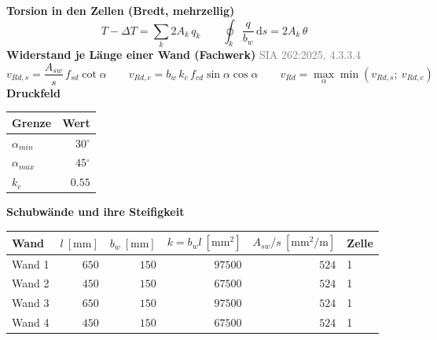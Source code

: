 \documentclass[11pt,a4paper]{article}
\newcommand{\normref}[1]{{\small\textcolor{gray}{#1}}}
\begin{document}
\noindent\textbf{Torsion in den Zellen (Bredt, mehrzellig)}
\begin{equation*}
T - \Delta T = \sum_k 2 A_k\, q_k \qquad \oint_k \frac{q}{b_w}\, \mathrm{d}s = 2 A_k\, \theta
\end{equation*}
\noindent\textbf{Widerstand je Länge einer Wand (Fachwerk)} \hfill \normref{SIA 262:2025, 4.3.3.4}
\begin{equation*}
v_{Rd,s} = \frac{A_{sw}}{s}\, f_{sd} \cot\alpha \qquad v_{Rd,c} = b_w\, k_c\, f_{cd} \sin\alpha \cos\alpha \qquad v_{Rd} = \max_\alpha \min(v_{Rd,s};\ v_{Rd,c})
\end{equation*}
\noindent\textbf{Druckfeld}
\begin{longtable}{lr}
\hline
Grenze & Wert \\
\hline
\endhead
$\alpha_{min}$ & $30{}^{\circ}$ \\
$\alpha_{max}$ & $45{}^{\circ}$ \\
$k_c$ & $0.55$ \\
\hline
\end{longtable}
\noindent\textbf{Schubwände und ihre Steifigkeit}
\begin{longtable}{lrrrrl}
\hline
Wand & $l\ [\mathrm{mm}]$ & $b_w\ [\mathrm{mm}]$ & $k = b_w l\ [\mathrm{mm}^2]$ & $A_{sw}/s\ [\mathrm{mm^2/m}]$ & Zelle \\
\hline
\endhead
Wand 1 & $650$ & $150$ & $97500$ & $524$ & 1 \\
Wand 2 & $450$ & $150$ & $67500$ & $524$ & 1 \\
Wand 3 & $650$ & $150$ & $97500$ & $524$ & 1 \\
Wand 4 & $450$ & $150$ & $67500$ & $524$ & 1 \\
\hline
\end{longtable}
\end{document}
